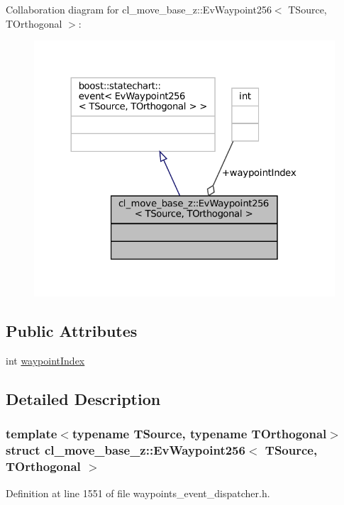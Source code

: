 Collaboration diagram for cl\+\_\+move\+\_\+base\+\_\+z\+:\+:Ev\+Waypoint256$<$ T\+Source, T\+Orthogonal $>$\+:
\nopagebreak
\begin{figure}[H]
\begin{center}
\leavevmode
\includegraphics[width=324pt]{structcl__move__base__z_1_1EvWaypoint256__coll__graph}
\end{center}
\end{figure}
\subsection*{Public Attributes}
\begin{DoxyCompactItemize}
\item 
int \hyperlink{structcl__move__base__z_1_1EvWaypoint256_a15e1ec1788d5bc0d3eacf08e124b22cd}{waypoint\+Index}
\end{DoxyCompactItemize}


\subsection{Detailed Description}
\subsubsection*{template$<$typename T\+Source, typename T\+Orthogonal$>$\newline
struct cl\+\_\+move\+\_\+base\+\_\+z\+::\+Ev\+Waypoint256$<$ T\+Source, T\+Orthogonal $>$}



Definition at line 1551 of file waypoints\+\_\+event\+\_\+dispatcher.\+h.



